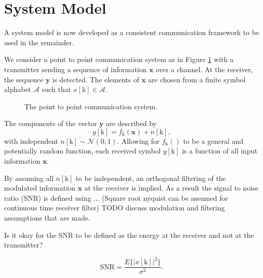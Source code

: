 \documentclass[12pt,a4paper]{report}
\begin{document}
\par

\section{System Model}

A system model is now developed as a consistent communication framework to be used in the remainder.
\par
We consider a point to point communication system as in Figure \ref{fig:model} with a transmitter sending a sequence of information $\mathbf{x}$ over a channel. At the receiver, the sequence  $\mathbf{y}$ is detected. 
The elements of $\mathbf{x}$ are chosen from a finite symbol alphabet $\mathcal{A}$ such that $x[\text{k}] \in \mathcal{A}$.

\begin{figure}[H]
\caption{The point to point communication system.}
\label{fig:model}
\end{figure}

The components of the vector $\mathbf{y}$ are described by 
\begin{equation*}
y[\text{k}] = f_{\text{k}}(\mathbf{x}) + n[\text{k}],
\end{equation*}
with independent $n[\text{k}]\sim \mathcal{N}(0,1).$
Allowing for $f_{\text{k}}()$ to be a general and potentially random function, each received symbol $y[\text{k}]$ is a function of all input information $\mathbf{x}$.

By assuming all $n[\text{k}]$ to be independent, an orthogonal filtering of the modulated information $\mathbf{x}$ at the receiver is implied. As a result the signal to noise ratio (SNR) is defined using ... (Square root nyquist can be assumed for continuous time receiver filter)
TODO discuss modulation and filtering assumptions that are made. 

Is it okay for the SNR to be defined as the energy at the receiver and not at the transmitter?

\begin{equation*}
\text{SNR} = \frac{E\{|x[\text{k}]|^2\}}{\sigma^2}.
\end{equation*}
\par
\end{document}
